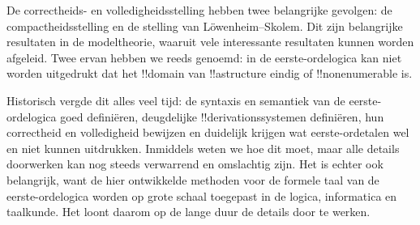 \documentclass[../../../include/open-logic-section]{subfiles}
\begin{document}
De correctheids- en volledigheidsstelling hebben twee belangrijke
gevolgen: de compactheidsstelling en de stelling van
L\"owenheim--Skolem. Dit zijn belangrijke resultaten in de modeltheorie,
waaruit vele interessante resultaten kunnen worden afgeleid. Twee
ervan hebben we reeds genoemd: in de eerste-ordelogica kan niet worden
uitgedrukt dat het !!{domain} van !!a{structure} eindig of
!!{nonenumerable} is.

Historisch vergde dit alles veel tijd: de syntaxis en semantiek van de
eerste-ordelogica goed definiëren, deugdelijke !!{derivation}ssystemen
definiëren, hun correctheid en volledigheid bewijzen en duidelijk
krijgen wat eerste-ordetalen wel en niet kunnen uitdrukken. Inmiddels
weten we hoe dit moet, maar alle details doorwerken kan nog steeds
verwarrend en omslachtig zijn. Het is echter ook belangrijk, want de
hier ontwikkelde methoden voor de formele taal van de eerste-ordelogica
worden op grote schaal toegepast in de logica, informatica en
taalkunde. Het loont daarom op de lange duur de details door te werken.
\end{document}
